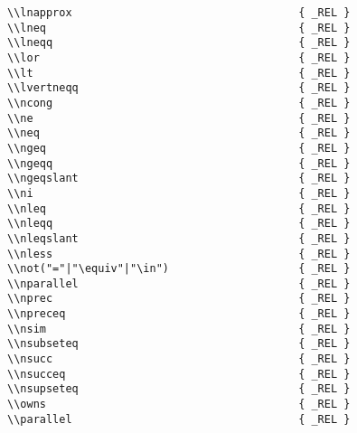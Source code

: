 \begin{verbatim}
\\lnapprox                                   { _REL }
\\lneq                                       { _REL }
\\lneqq                                      { _REL }
\\lor                                        { _REL } 
\\lt                                         { _REL }
\\lvertneqq                                  { _REL }
\\ncong                                      { _REL }
\\ne                                         { _REL }
\\neq                                        { _REL }
\\ngeq                                       { _REL }
\\ngeqq                                      { _REL }
\\ngeqslant                                  { _REL }
\\ni                                         { _REL }
\\nleq                                       { _REL }
\\nleqq                                      { _REL }
\\nleqslant                                  { _REL }
\\nless                                      { _REL } 
\\not("="|"\equiv"|"\in")                    { _REL }
\\nparallel                                  { _REL }
\\nprec                                      { _REL }
\\npreceq                                    { _REL }
\\nsim                                       { _REL }
\\nsubseteq                                  { _REL }
\\nsucc                                      { _REL }
\\nsucceq                                    { _REL }
\\nsupseteq                                  { _REL }
\\owns                                       { _REL }
\\parallel                                   { _REL }

\end{verbatim}
